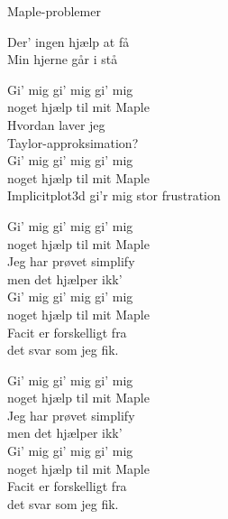 \begin{song}{Maple-problemer}
  \begin{SBSection*}
    Der' ingen hjælp at få\\
    Min hjerne går i stå
  \end{SBSection*}

  \begin{SBChorus}
    Gi' mig gi' mig gi' mig\\
    noget hjælp til mit Maple\\
    Hvordan laver jeg\\
    Taylor-approksimation?\\
    Gi' mig gi' mig gi' mig\\
    noget hjælp til mit Maple\\
    Implicitplot3d gi'r mig stor frustration
  \end{SBChorus}

  \begin{SBChorus}
    Gi' mig gi' mig gi' mig\\
    noget hjælp til mit Maple\\
    Jeg har prøvet simplify\\
    men det hjælper ikk'\\
    Gi' mig gi' mig gi' mig\\
    noget hjælp til mit Maple\\
    Facit er forskelligt fra\\
    det svar som jeg fik.
  \end{SBChorus}

  \begin{SBChorus}
    Gi' mig gi' mig gi' mig\\
    noget hjælp til mit Maple\\
    Jeg har prøvet simplify\\
    men det hjælper ikk'\\
    Gi' mig gi' mig gi' mig\\
    noget hjælp til mit Maple\\
    Facit er forskelligt fra\\
    det svar som jeg fik.
  \end{SBChorus}
\end{song}
